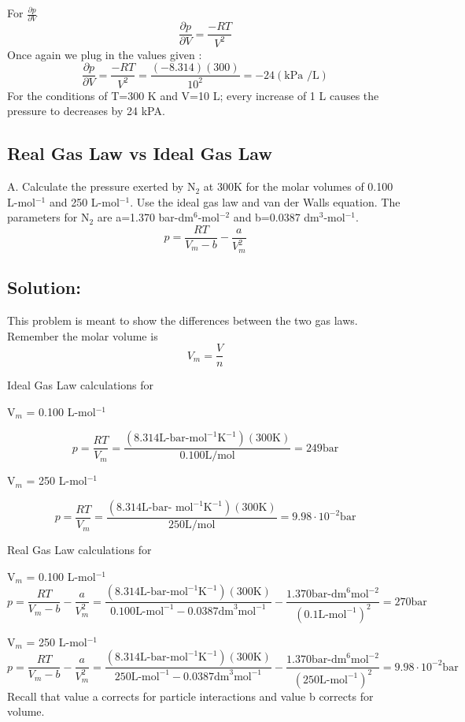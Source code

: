 \documentclass{article}
\newcommand{\be}{\begin{equation}}
\newcommand{\ee}{\end{equation}}
\newcommand{\pd}{\partial}
\begin{document}
For $\frac{\pd p}{\pd V}$
\be
\frac{\pd p}{\pd V} = \frac{-RT}{V^2}
\ee
Once again we plug in the values given : 
\be
\frac{\pd p}{\pd V} = \frac{-RT}{V^2} = \frac{(-8.314)(300)}{10^2} = -24 (\text{kPa /L})
\ee
For the conditions of T=300 K and V=10 L; every increase of 1 L causes the pressure to decreases by 24 kPA. 

\subsection{Real Gas Law vs Ideal Gas Law}
A. Calculate the pressure exerted by N$_2$ at 300K for the molar volumes of 0.100 L-mol$^{-1}$ and 250 L-mol$^{-1}$. 
Use the  ideal gas law and van der Walls equation. 
The parameters for N$_2$ are a=1.370 bar-dm$^6$-mol$^{-2}$ and b=0.0387 dm$^3$-mol$^{-1}$.
\be
p=\frac{RT}{V_m - b}-\frac{a}{V^2_m}
\ee

\subsection*{Solution:}
This problem is meant to show the differences between the two gas laws.
Remember the molar volume is 
\be
V_m = \frac{V}{n}
\ee

Ideal Gas Law calculations for 

V$_m$ = 0.100 L-mol$^{-1}$ 

\be
p = \frac{RT}{V_m} = \frac{(8.314 \text{L-bar-mol}^{-1}\text{K}^{-1})(300 \text{K})}{0.100 \text{L/mol}} = 249 \text{bar}
\ee

V$_m$ = 250 L-mol$^{-1}$ 

\be
p = \frac{RT}{V_m} = \frac{(8.314\text{L-bar- mol}^{-1}\text{K}^{-1})(300\text{K})}{250\text{L/mol}} = 9.98 \cdot 10^{-2} \text{bar}
\ee

Real Gas Law calculations for 

V$_m$ = 0.100 L-mol$^{-1}$ 
\be
p=\frac{RT}{V_m - b}-\frac{a}{V^2_m} = \frac{(8.314\text{L-bar-mol}^{-1}\text{K}^{-1})(300\text{K})}{0.100\text{L-mol}^{-1} - 0.0387\text{dm}^3\text{mol}^{-1}} - \frac{1.370\text{bar-dm}^6\text{mol}^{-2}}{(0.1\text{L-mol}^{-1})^2} = 270 \text{bar}
\ee

V$_m$ = 250 L-mol$^{-1}$ 
\be
p=\frac{RT}{V_m - b}-\frac{a}{V^2_m} = \frac{(8.314\text{L-bar-mol}^{-1}\text{K}^{-1})(300\text{K})}{250\text{L-mol}^{-1} - 0.0387\text{dm}^3\text{mol}^{-1}} - \frac{1.370\text{bar-dm}^6\text{mol}^{-2}}{(250\text{L-mol}^{-1})^2} = 9.98 \cdot 10^{-2} \text{bar}
\ee
Recall that value a corrects for particle interactions and value b corrects for volume. 
\end{document}
